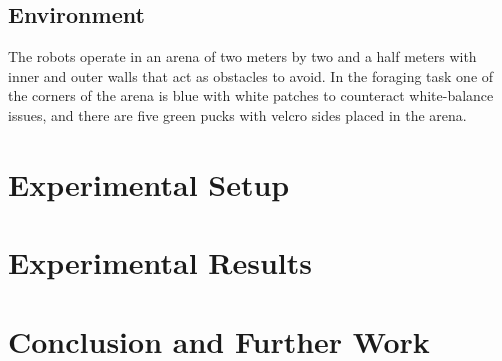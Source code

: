 \documentclass{article}
\begin{document}
	\subsection{Environment} %
	\label{sub:Environment}
	The robots operate in an arena of two meters by two and a half meters with
	inner and outer walls that act as obstacles to avoid.
	In the foraging task one of the corners of the arena is blue with white
	patches to counteract white-balance issues, and there are five green pucks
	with velcro sides placed in the arena.

	\section{Experimental Setup} %
	\label{sec:setup}


	\section{Experimental Results} %
	\label{sec:results}
	

	\section{Conclusion and Further Work} %
	\label{sec:conclusion}
	


\end{document}
